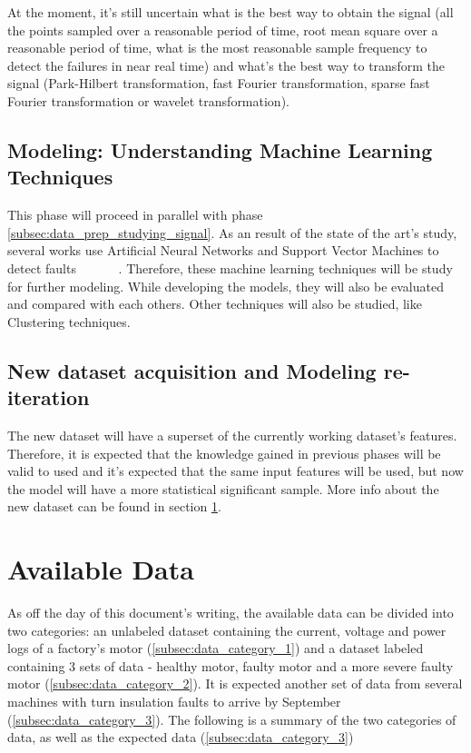 At the moment, it's still uncertain what is the best way to obtain the signal (all the points sampled over a reasonable period of time, root mean square over a reasonable period of time, what is the most reasonable sample frequency to detect the failures in near real time) and what's the best way to transform the signal (Park-Hilbert transformation, fast Fourier transformation, sparse fast Fourier transformation or wavelet transformation).


\subsection{Modeling: Understanding Machine Learning Techniques}
\label{subsec:modeling_under_machine_learning}

This phase will proceed in parallel with phase \ref{subsec:data_prep_studying_signal}. As an result of the state of the art's study, several works use Artificial Neural Networks and Support Vector Machines to detect faults ~\cite{Toma2011} ~\cite{Wolkiewicz2013} ~\cite{Patel2016} ~\cite{Jagadanand2015}. Therefore, these machine learning techniques will be study for further modeling. While developing the models, they will also be evaluated and compared with each others.  
Other techniques will also be studied, like Clustering techniques.

\subsection{New dataset acquisition and Modeling re-iteration}
\label{subsec:reiteration}

The new dataset will have a superset of the currently working dataset's features. Therefore, it is expected that the knowledge gained in previous phases will be valid to used and it's expected that the same input features will be used, but now the model will have a more statistical significant sample. More info about the new dataset can be found in section \ref{sec:available_data}.


\section{Available Data}
\label{sec:available_data}

As off the day of this document's writing, the available data can be divided into two categories: an unlabeled dataset containing the current, voltage and power logs of a factory's motor (\ref{subsec:data_category_1}) and a dataset labeled containing 3 sets of data - healthy motor, faulty motor and a more severe faulty motor (\ref{subsec:data_category_2}).
It is expected another set of data from several machines with turn insulation faults to arrive by September (\ref{subsec:data_category_3}).
The following is a summary of the two categories of data, as well as the expected data (\ref{subsec:data_category_3})

